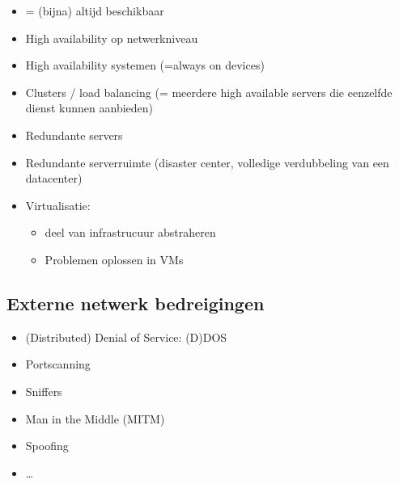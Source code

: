 \documentclass{article}
\begin{document}
\begin{itemize}
    \item = (bijna) altijd beschikbaar
    \item High availability op netwerkniveau
    \item High availability systemen (=always on devices)
    \item Clusters / load balancing (= meerdere high available servers die eenzelfde dienst kunnen aanbieden)
    \item Redundante servers
    \item Redundante serverruimte (disaster center, volledige verdubbeling van een datacenter)
    \item Virtualisatie: 
    \begin{itemize}
        \item deel van infrastrucuur abstraheren
        \item Problemen oplossen in VMs
    \end{itemize} 
\end{itemize}

\subsection{Externe netwerk bedreigingen}

\begin{itemize}
    \item (Distributed) Denial of Service: (D)DOS
    \item Portscanning
    \item Sniffers
    \item Man in the Middle (MITM)
    \item Spoofing
    \item \dots
\end{itemize}
\end{document}
